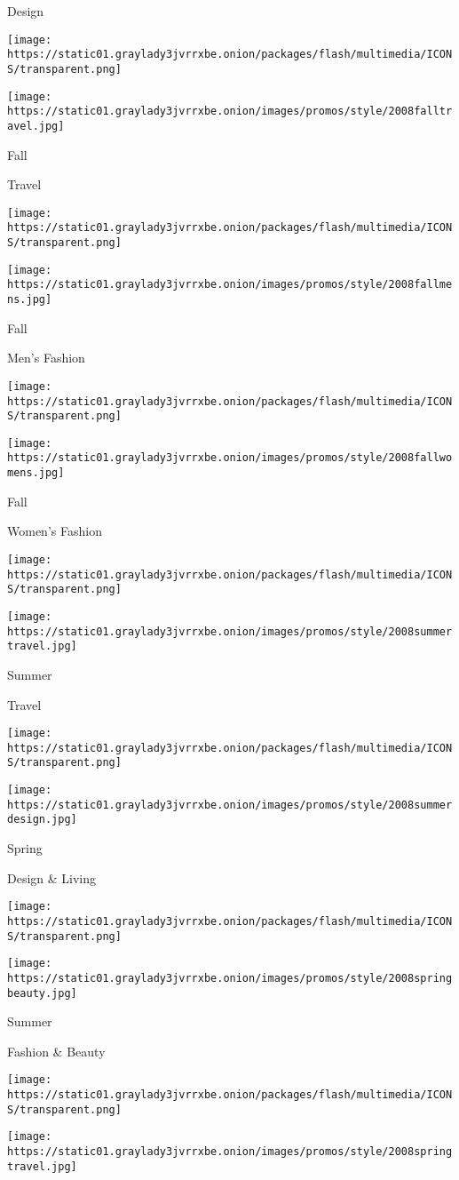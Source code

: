 Design

\texttt{[image: https://static01.graylady3jvrrxbe.onion/packages/flash/multimedia/ICONS/transparent.png]}

\texttt{[image: https://static01.graylady3jvrrxbe.onion/images/promos/style/2008falltravel.jpg]}

Fall

Travel

\texttt{[image: https://static01.graylady3jvrrxbe.onion/packages/flash/multimedia/ICONS/transparent.png]}

\texttt{[image: https://static01.graylady3jvrrxbe.onion/images/promos/style/2008fallmens.jpg]}

Fall

Men's Fashion

\texttt{[image: https://static01.graylady3jvrrxbe.onion/packages/flash/multimedia/ICONS/transparent.png]}

\texttt{[image: https://static01.graylady3jvrrxbe.onion/images/promos/style/2008fallwomens.jpg]}

Fall

Women's Fashion

\texttt{[image: https://static01.graylady3jvrrxbe.onion/packages/flash/multimedia/ICONS/transparent.png]}

\texttt{[image: https://static01.graylady3jvrrxbe.onion/images/promos/style/2008summertravel.jpg]}

Summer

Travel

\texttt{[image: https://static01.graylady3jvrrxbe.onion/packages/flash/multimedia/ICONS/transparent.png]}

\texttt{[image: https://static01.graylady3jvrrxbe.onion/images/promos/style/2008summerdesign.jpg]}

Spring

Design \& Living

\texttt{[image: https://static01.graylady3jvrrxbe.onion/packages/flash/multimedia/ICONS/transparent.png]}

\texttt{[image: https://static01.graylady3jvrrxbe.onion/images/promos/style/2008springbeauty.jpg]}

Summer

Fashion \& Beauty

\texttt{[image: https://static01.graylady3jvrrxbe.onion/packages/flash/multimedia/ICONS/transparent.png]}

\texttt{[image: https://static01.graylady3jvrrxbe.onion/images/promos/style/2008springtravel.jpg]}

